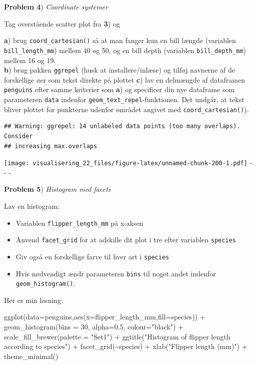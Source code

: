 \documentclass[
]{book}
\newenvironment{Shaded}{\begin{snugshade}}{\end{snugshade}}
\newcommand{\AttributeTok}[1]{\textcolor[rgb]{0.77,0.63,0.00}{#1}}
\newcommand{\DecValTok}[1]{\textcolor[rgb]{0.00,0.00,0.81}{#1}}
\newcommand{\FloatTok}[1]{\textcolor[rgb]{0.00,0.00,0.81}{#1}}
\newcommand{\FunctionTok}[1]{\textcolor[rgb]{0.00,0.00,0.00}{#1}}
\newcommand{\NormalTok}[1]{#1}
\newcommand{\SpecialCharTok}[1]{\textcolor[rgb]{0.00,0.00,0.00}{#1}}
\newcommand{\StringTok}[1]{\textcolor[rgb]{0.31,0.60,0.02}{#1}}
\providecommand{\tightlist}{%
  \setlength{\itemsep}{0pt}\setlength{\parskip}{0pt}}
\begin{document}
\textbf{Problem 4}) \emph{Coordinate systemer}

Tag overstående scatter plot fra \textbf{3}) og

\textbf{a}) brug \texttt{coord\_cartesian()} så at man fanger kun en bill længde (variablen \texttt{bill\_length\_mm}) mellem 40 og 50, og en bill depth (variablen \texttt{bill\_depth\_mm}) mellem 16 og 19.\\
\textbf{b}) brug pakken \texttt{ggrepel} (husk at installere/inlæse) og tilføj navnerne af de forskellige øer som tekst direkte på plottet
\textbf{c}) lav en delmængde af dataframen \texttt{penguins} efter samme kriterier som \textbf{a}) og specificer din nye dataframe som parameteren \texttt{data} indenfor \texttt{geom\_text\_repel}-funktionen. Det undgår, at tekst bliver plottet for punkterne udenfor området angivet med \texttt{coord\_cartesian()}).

\begin{verbatim}
## Warning: ggrepel: 14 unlabeled data points (too many overlaps). Consider
## increasing max.overlaps
\end{verbatim}

\texttt{[image: visualisering\_22\_files/figure-latex/unnamed-chunk-200-1.pdf]}
- - -

\textbf{Problem 5}) \emph{Histogram med facets}

Lav en histogram:

\begin{itemize}
\tightlist
\item
  Variablen \texttt{flipper\_length\_mm} på x-aksen
\item
  Anvend \texttt{facet\_grid} for at adskille dit plot i tre efter variablen \texttt{species}
\item
  Giv også en forskellige farve til hver art i \texttt{species}
\item
  Hvis nødvendigt ændr parameteren \texttt{bins} til noget andet indenfor \texttt{geom\_histogram()}.
\end{itemize}

Her er min løsning:

\begin{Shaded}
\begin{Highlighting}[]
\FunctionTok{ggplot}\NormalTok{(}\AttributeTok{data=}\NormalTok{penguins,}\FunctionTok{aes}\NormalTok{(}\AttributeTok{x=}\NormalTok{flipper\_length\_mm,}\AttributeTok{fill=}\NormalTok{species)) }\SpecialCharTok{+}
  \FunctionTok{geom\_histogram}\NormalTok{(}\AttributeTok{bins =} \DecValTok{30}\NormalTok{, }\AttributeTok{alpha=}\FloatTok{0.5}\NormalTok{, }\AttributeTok{colour=}\StringTok{"black"}\NormalTok{) }\SpecialCharTok{+}
  \FunctionTok{scale\_fill\_brewer}\NormalTok{(}\AttributeTok{palette =} \StringTok{"Set1"}\NormalTok{) }\SpecialCharTok{+}
  \FunctionTok{ggtitle}\NormalTok{(}\StringTok{"Histogram of flipper length according to species"}\NormalTok{) }\SpecialCharTok{+}
  \FunctionTok{facet\_grid}\NormalTok{(}\SpecialCharTok{\textasciitilde{}}\NormalTok{species) }\SpecialCharTok{+}
  \FunctionTok{xlab}\NormalTok{(}\StringTok{"Flipper length (mm)"}\NormalTok{) }\SpecialCharTok{+}
  \FunctionTok{theme\_minimal}\NormalTok{()}
\end{Highlighting}
\end{Shaded}
\end{document}
